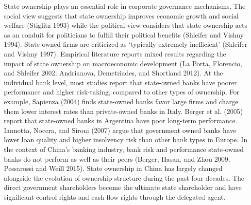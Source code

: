 \documentclass{article}
\begin{document}
State ownership plays an essential role in corporate governance
mechanisms. The social view suggests that state ownership improves
economic growth and social welfare (Stiglitz 1993) while the political
view considers that state ownership acts as an conduit for politicians
to fulfill their political benefits (Shleifer and Vishny 1994).
State-owned firms are criticized as `typically extremely inefficient'
(Shleifer and Vishny 1997). Empirical literature reports mixed results
regarding the impact of state ownership on macroeconomic development (La
Porta, Florencio, and Shleifer 2002; Andrianova, Demetriades, and
Shortland 2012). At the individual bank level, most studies report that
state-owned banks have poorer performance and higher risk-taking,
compared to other types of ownership. For example, Sapienza (2004) finds
state-owned banks favor large firms and charge them lower interest rates
than private-owned banks in Italy. Berger et al. (2005) report that
state-owned banks in Argentina have poor long-term performance.
Iannotta, Nocera, and Sironi (2007) argue that government owned banks
have lower loan quality and higher insolvency risk than other bank types
in Europe. In the context of China's banking industry, bank risk and
performance state-owned banks do not perform as well as their peers
(Berger, Hasan, and Zhou 2009; Pessarossi and Weill 2015). State
ownership in China has largely changed alongside the evolution of
ownership structure during the past four decades. The direct government
shareholders become the ultimate state shareholder and have significant
control rights and cash flow rights through the delegated agent.

\providecommand{\docline}[3]{\noalign{\global\setlength{\arrayrulewidth}{#1}}\arrayrulecolor[HTML]{#2}\cline{#3}}

\setlength{\tabcolsep}{2pt}

\renewcommand*{\arraystretch}{1.5}
\end{document}
